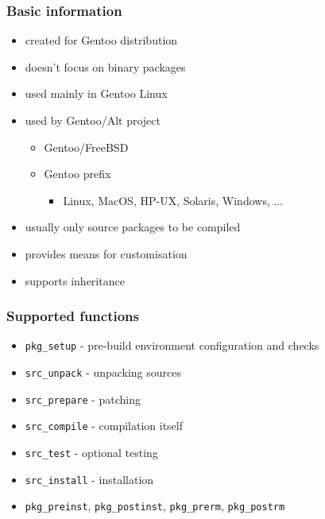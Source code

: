
\begin{frame}[t]
   \frametitle{Basic information}
   \begin{itemize}
	\item created for Gentoo distribution
	\item doesn't focus on binary packages
   \item used mainly in Gentoo Linux
   \item used by Gentoo/Alt project
	\begin{itemize}
		\item Gentoo/FreeBSD
		\item Gentoo prefix
	   \begin{itemize}
         \item Linux, MacOS, HP-UX, Solaris, Windows, ...
	   \end{itemize}
	\end{itemize}
   \item usually only source packages to be compiled
   \item provides means for customisation
   \item supports inheritance
   \end{itemize}
\end{frame}

\begin{frame}[t]
   \frametitle{Supported functions}
   \begin{itemize}
   \item \texttt{pkg\_setup} - pre-build environment configuration and checks
   \item \texttt{src\_unpack} - unpacking sources
   \item \texttt{src\_prepare} - patching
   \item \texttt{src\_compile} - compilation itself
   \item \texttt{src\_test} - optional testing
   \item \texttt{src\_install} - installation
   \item \texttt{pkg\_preinst}, \texttt{pkg\_postinst}, \texttt{pkg\_prerm}, \texttt{pkg\_postrm}
   \end{itemize}
\end{frame}

